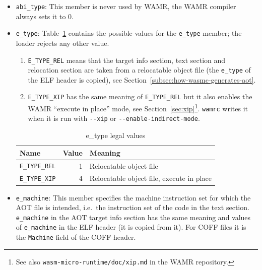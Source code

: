 \documentclass{article}
\begin{document}
\begin{itemize}
    \item \verb|abi_type|:
        This member is never used by WAMR, the WAMR compiler always sets it to 0.

    \item \verb|e_type|:
        Table~\ref{table:e-type-legal-value} contains the possible values for the \verb|e_type| member; the loader rejects any other value.
        \begin{enumerate}
            \item \verb|E_TYPE_REL| means that the target info section, text section and relocation section are taken from a relocatable object file (the \verb|e_type| of the ELF header is copied), see Section~\ref{subsec:how-wasmc-generates-aot}.
            \item \verb|E_TYPE_XIP| has the same meaning of \verb|E_TYPE_REL| but it also enables the WAMR ``execute in place'' mode, see Section~\ref{sec:xip}\footnote{See also \texttt{wasm-micro-runtime/doc/xip.md} in the WAMR repository.}.
                \texttt{wamrc} writes it when it is run with \verb|--xip| or \verb|--enable-indirect-mode|.
        \end{enumerate}

        \begin{table}[H]
        \centering
        \begin{tabular}{lrl}
            \hline
            Name & Value & Meaning \\
            \hline
            \verb|E_TYPE_REL| & 1 & Relocatable object file \\
            \verb|E_TYPE_XIP| & 4 & Relocatable object file, execute in place \\
            \hline
        \end{tabular}
        \caption{e\_type legal values}
        \label{table:e-type-legal-value}
        \end{table}

    \item \verb|e_machine|:
        This member specifies the machine instruction set for which the AOT file is intended, i.e.\ the instruction set of the code in the text section.
        \verb|e_machine| in the AOT target info section has the same meaning and values of \verb|e_machine| in the ELF header \cite[Ch.~2]{elf-spec-gabi-v42} (it is copied from it).
        For COFF files it is the \verb|Machine| field of the COFF header.


\end{itemize}
\end{document}

